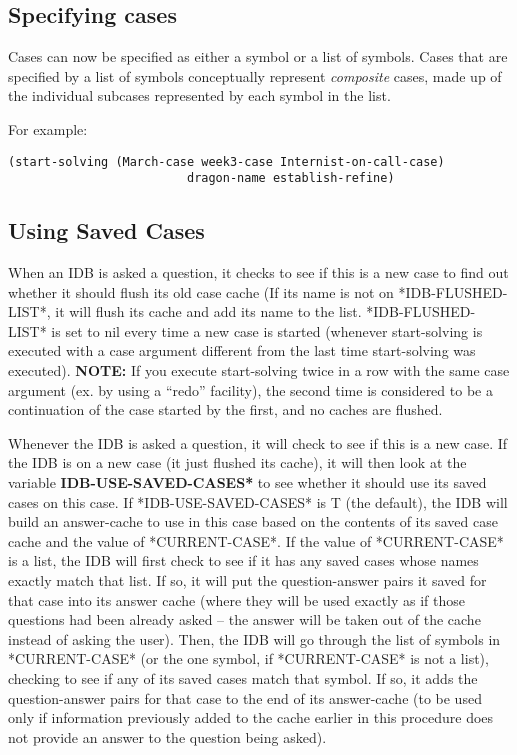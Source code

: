 \subsection{Specifying cases}

Cases can now be specified as either a symbol or a list of symbols.
Cases that are specified by a list of symbols conceptually represent
{\it composite} cases, made up of the individual subcases represented
by each symbol in the list.

For example:
\begin{verbatim}
(start-solving (March-case week3-case Internist-on-call-case)
	      				 dragon-name establish-refine)
\end{verbatim}

\subsection{Using Saved Cases}

When an IDB is asked a question, it checks to see if this is a new
case to find out whether it should flush its old case cache (If its
name is not on *IDB-FLUSHED-LIST*, it will flush its cache and add its
name to the list. *IDB-FLUSHED-LIST* is set to nil every time a new
case is started (whenever start-solving is executed with a case argument
different from the last time start-solving was executed). {\bf NOTE:}
If you execute start-solving twice in a row with the same case
argument (ex. by using a ``redo'' facility), the second time is
considered to be a continuation of the case started by the first, and
no caches are flushed.

Whenever the IDB is asked a question, it will check to see if this is
a new case. If the IDB is on a new case (it just flushed its cache),
it will then look at the variable {\bf *IDB-USE-SAVED-CASES*} to see
whether it should use its saved cases on this case. If
*IDB-USE-SAVED-CASES* is T (the default), the IDB will build an
answer-cache to use in this case based on the contents of its saved
case cache and the value of *CURRENT-CASE*. If the value of
*CURRENT-CASE* is a list, the IDB will first check to see if it has
any saved cases whose names exactly match that list. If so, it will
put the question-answer pairs it saved for that case into its answer
cache (where they will be used exactly as if those questions had been
already asked -- the answer will be taken out of the cache instead of
asking the user). Then, the IDB will go through the list of symbols in
*CURRENT-CASE* (or the one symbol, if *CURRENT-CASE* is not a list),
checking to see if any of its saved cases match that symbol. If so, it
adds the question-answer pairs for that case to the end of its
answer-cache (to be used only if information previously added to the
cache earlier in this procedure does not provide an answer to the
question being asked).

